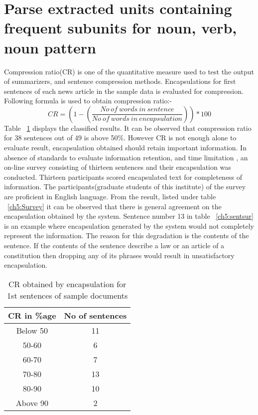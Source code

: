 \section{Parse extracted units containing frequent subunits for noun, verb, noun pattern}
Compression ratio(CR) is one of the quantitative measure used to test the output of summarizers, and sentence compression methods. Encapsulations for first sentences of
each news article in the sample data is evaluated for compression. Following formula is used to obtain compression ratio:-
\begin{displaymath}
  CR = (1 - (\frac{No\ of\ words\ in\ sentence}{No\ of\ words\ in\ encapsulation})) * 100
\end{displaymath}
Table ~\ref{ch5:CR} displays the classified results. It can be observed that compression ratio for 38 sentences out of 49 is above 50\%. However CR is not enough alone 
to evaluate result, encapsulation obtained should retain important information. In absence of standards to evaluate information retention, and time limitation
, an on-line survey consisting of thirteen sentences and their encapsulation was conducted. Thirteen participants scored encapsulated text for completeness of information.
The participants(graduate students of this institute) of the survey are proficient in English language.
From the result, listed under table ~\ref{ch5:Survey} it can be observed that there is general agreement on the encapsulation obtained by the system. Sentence number 13 
in table ~\ref{ch5:sentsur} is an example where encapsulation generated by the system would not completely represent the information. The reason for this degradation
is the contents of the sentence. If the contents of the sentence describe a law or an article of a constitution then dropping any of its phrases 
would result in unsatisfactory encapsulation.
\makeatletter
\setlength{\abovecaptionskip}{6pt}   %
\setlength{\belowcaptionskip}{6pt}   %
\long\def\@makecaption#1#2{%
  \vskip\abovecaptionskip
  \sbox\@tempboxa{#1 #2}%
  \ifdim \wd\@tempboxa >\hsize
    #1: #2\par
  \else
    \global \@minipagefalse
    \hb@xt@\hsize{\box\@tempboxa\hfil}%
  \fi
  \vskip\belowcaptionskip}
\makeatother


 \begin{table}[h]
\label{ch5:CR}
\caption{CR obtained by encapsulation for 1st sentences of sample documents}
 \begin{tabular}{|c|c|}
 \hline
CR in \%age & No of sentences \\ \hline
Below 50 & 11 \\ \hline
50-60 & 6 \\ \hline
60-70 & 7 \\ \hline
70-80 & 13 \\ \hline
80-90 & 10 \\ \hline
Above 90 & 2 \\ \hline
 \end{tabular}
\end{table}




